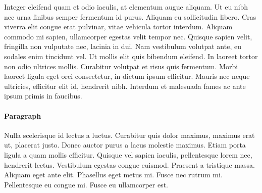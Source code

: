\documentclass[10pt,sigconf,anonymous]{acmart}
\begin{document}
Integer eleifend quam et odio iaculis, at elementum augue aliquam.
Ut eu nibh nec urna finibus semper fermentum id purus.
Aliquam eu sollicitudin libero.
Cras viverra elit congue erat pulvinar, vitae vehicula tortor interdum.
Aliquam commodo mi sapien, ullamcorper egestas velit tempor nec.
Quisque sapien velit, fringilla non vulputate nec, lacinia in dui.
Nam vestibulum volutpat ante, eu sodales enim tincidunt vel.
Ut mollis elit quis bibendum eleifend.
In laoreet tortor non odio ultrices mollis.
Curabitur volutpat et risus quis fermentum.
Morbi laoreet ligula eget orci consectetur, in dictum ipsum efficitur.
Mauris nec neque ultricies, efficitur elit id, hendrerit nibh.
Interdum et malesuada fames ac ante ipsum primis in faucibus.



\paragraph{Paragraph}

Nulla scelerisque id lectus a luctus.
Curabitur quis dolor maximus, maximus erat ut, placerat justo.
Donec auctor purus a lacus molestie maximus.
Etiam porta ligula a quam mollis efficitur.
Quisque vel sapien iaculis, pellentesque lorem nec, hendrerit lectus.
Vestibulum egestas congue euismod.
Praesent a tristique massa.
Aliquam eget ante elit.
Phasellus eget metus mi.
Fusce nec rutrum mi.
Pellentesque eu congue mi.
Fusce eu ullamcorper est.




\end{document}
